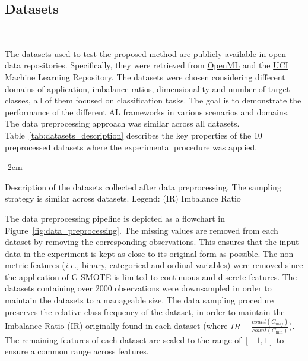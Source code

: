 \documentclass[parskip=full]{scrartcl}
\begin{document}
\subsection{Datasets}~\label{sec:datasets}

The datasets used to test the proposed method are publicly available in open
data repositories. Specifically, they were retrieved from
\href{https://www.openml.org/}{OpenML} and the
\href{https://archive.ics.uci.edu/}{UCI Machine Learning Repository}. The
datasets were chosen considering different domains of application, imbalance
ratios, dimensionality and number of target classes, all of them focused on
classification tasks. The goal is to demonstrate the performance of the
different AL frameworks in various scenarios and domains. The data
preprocessing approach was similar across all datasets.
Table~\ref{tab:datasets_description} describes the key properties of the 10
preprocessed datasets where the experimental procedure was applied. 

\begin{table}[H]
    \centering
    \addtolength{\leftskip} {-2cm}
    \addtolength{\rightskip}{-2cm}
    \caption{\label{tab:datasets_description}
        Description of the datasets collected after data preprocessing. The
        sampling strategy is similar across datasets. Legend: (IR) Imbalance
        Ratio
    }
\end{table}

The data preprocessing pipeline is depicted as a flowchart in
Figure~\ref{fig:data_preprocessing}. The missing values are removed from each
dataset by removing the corresponding observations. This ensures that the
input data in the experiment is kept as close to its original form as
possible. The non-metric features (\textit{i.e.,} binary, categorical and
ordinal variables) were removed since the application of G-SMOTE is limited to
continuous and discrete features. The datasets containing over 2000
observations were downsampled in order to maintain the datasets to a
manageable size. The data sampling procedure preserves the relative class
frequency of the dataset, in order to maintain the Imbalance Ratio (IR)
originally found in each dataset (where $IR =
\frac{count(C_{maj})}{count(C_{\min})}$). The remaining features of each
dataset are scaled to the range of $[-1, 1]$ to ensure a common range across
features.
\end{document}
